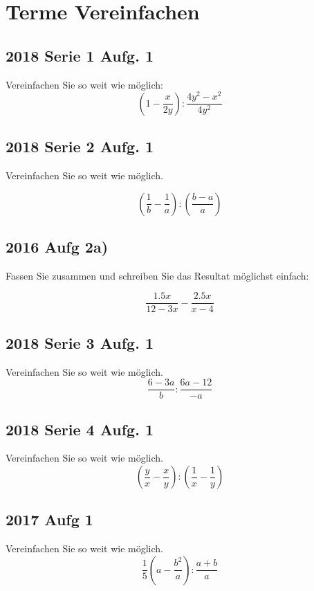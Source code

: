 




\usepackage{amssymb} %
\renewcommand{\metaHeaderLine}{Arbeitsblatt}
\renewcommand{\arbeitsblattTitel}{Gemischte Aufgaben aus alten Maturaprüfungen}

\arbeitsblattHeader{}
\section{Terme Vereinfachen}
\subsection{2018 Serie 1 Aufg. 1}

Vereinfachen Sie so weit wie möglich:
$$\left(1-\frac{x}{2y}\right) : \frac{4y^2-x^2}{4y^2}$$

\subsection{2018 Serie 2 Aufg. 1}
Vereinfachen Sie so weit wie möglich.

$$\left(\frac{1}{b}-\frac{1}{a}\right) : \left( \frac{b-a}{a}\right)$$


\subsection{2016 Aufg 2a)}
Fassen Sie zusammen und schreiben Sie das Resultat möglichst einfach:

$$\frac{1.5x}{12-3x} - \frac{2.5x}{x-4}$$

\subsection{2018 Serie 3 Aufg. 1}
Vereinfachen Sie so weit wie möglich.
$$\frac{6-3a}{b} : \frac{6a-12}{-a}$$

\subsection{2018 Serie 4 Aufg. 1}
Vereinfachen Sie so weit wie möglich.
$$\left(\frac{y}{x}  - \frac{x}{y} \right) : \left( \frac{1}{x} - \frac{1}{y} \right) $$


\subsection{2017 Aufg 1}
Vereinfachen Sie so weit wie möglich.
$$\frac{1}{5}\left( a-\frac{b^2}{a}\right): \frac{a+b}{a}$$

